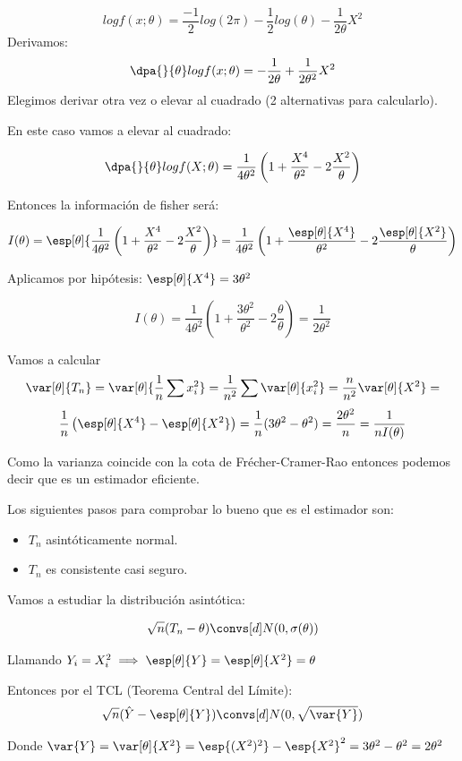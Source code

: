 \begin{problem}[2]
\[ log f(x;\theta) = \frac{-1}{2}log(2\pi)-\frac{1}{2}log(\theta) - \frac{1}{2\theta}X^2\]
Derivamos:
\[\dpa{}{\theta} log f(x;\theta) = -\frac{1}{2\theta} + \frac{1}{2\theta^2}X^2\]
Elegimos derivar otra vez o elevar al cuadrado (2 alternativas para calcularlo).

En este caso vamos a elevar al cuadrado:

\[\dpa{}{\theta}logf(X;\theta) = \frac{1}{4\theta^2} \left( 1+\frac{X^4}{\theta^2} - 2\frac{X^2}{\theta}\right)\]

Entonces la información de fisher será:

\[I(\theta) = \esp[\theta]{\frac{1}{4\theta^2} \left( 1+\frac{X^4}{\theta^2} - 2\frac{X^2}{\theta}\right)} = \frac{1}{4\theta^2} \left( 1+\frac{\esp[\theta]{X^4}}{\theta^2} - 2\frac{\esp[\theta]{X^2}}{\theta}\right)\]

Aplicamos por hipótesis: $\esp[\theta]{X^4} = 3\theta^2$

\[I(\theta) = \frac{1}{4\theta^2} \left(1+\frac{3\theta^2}{\theta^2} - 2 \frac{\theta}{\theta}\right) = \frac{1}{2\theta^2}\]

Vamos a calcular \[\var[\theta]{T_n} = \var[\theta]{\frac{1}{n}\sum x_i^2} = \frac{1}{n^2}\sum \var[\theta]{x_i^2} = \frac{n}{n^2} \var[\theta]{X^2} =\]
\[ \frac{1}{n}\left(\esp[\theta]{X^4} - \esp[\theta]{X^2}\right) = \frac{1}{n}(3\theta^2-\theta^2) = \frac{2\theta^2}{n} = \frac{1}{nI(\theta)}\]

Como la varianza coincide con la cota de Frécher-Cramer-Rao entonces podemos decir que es un estimador eficiente.

Los siguientes pasos para comprobar lo bueno que es el estimador son: \begin{itemize}
\item $T_n$ asintóticamente normal.
\item $T_n$ es consistente casi seguro.
\end{itemize}

\spart Vamos a estudiar la distribución asintótica:

\[\sqrt{n}(T_n-\theta) \convs[d] N(0,\sigma(\theta))\]

Llamando $Y_i = X_i^2 \implies \esp[\theta]{Y} = \esp[\theta]{X^2} = \theta$

Entonces por el TCL (Teorema Central del Límite): \[\displaystyle \sqrt{n}(\hat{Y} - \esp[\theta]{Y}) \convs[d] N(0,\sqrt{\var{Y}})\]

Donde $\var{Y} = \var[\theta]{X^2} = \esp{(X^2)^2} - \esp{X^2}^2 = 3\theta^2 - \theta^2 = 2\theta^2$
\end{problem}



